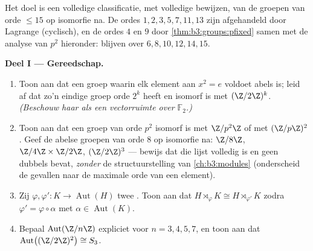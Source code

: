 \begin{problem}\label{pb:b3:groups:1}
Het doel is een volledige classificatie, met volledige bewijzen,
van de groepen van orde $\leq 15$ op isomorfie na. De ordes $1, 2,
3, 5, 7, 11, 13$ zijn afgehandeld door Lagrange (cyclisch), en de
ordes $4$ en $9$ door \cref{thm:b3:groups:pfixed} samen met de
analyse van $p^2$ hieronder: blijven over $6, 8, 10, 12, 14, 15$.

\medskip
\noindent\textbf{Deel I --- Gereedschap.}
\begin{enumerate}
  \item Toon aan dat een groep waarin elk element aan $x^2 = e$
        voldoet abels is; leid af dat zo'n eindige groep orde $2^k$
        heeft en isomorf is met $(\Z/2\Z)^k$. \emph{(Beschouw haar
        als een vectorruimte over $\mathbb F_2$.)}
  \item Toon aan dat een groep van orde $p^2$ isomorf is met
        $\Z/p^2\Z$ of met $(\Z/p\Z)^2$. Geef de abelse groepen van
        orde $8$ op isomorfie na: $\Z/8\Z$, $\Z/4\Z \times \Z/2\Z$,
        $(\Z/2\Z)^3$ --- bewijs dat die lijst volledig is en geen
        dubbels bevat, \emph{zonder} de structuurstelling van
        \cref{ch:b3:modules} (onderscheid de gevallen naar de
        maximale orde van een element).
  \item Zij $\varphi, \varphi' \colon K \to \operatorname{Aut}(H)$
        twee . Toon aan dat $H \rtimes_{\varphi} K \cong H
        \rtimes_{\varphi'} K$ zodra $\varphi' = \varphi \circ
        \alpha$ met $\alpha \in \operatorname{Aut}(K)$.
  \item Bepaal $\operatorname{Aut}(\Z/n\Z)$ expliciet voor $n = 3,
        4, 5, 7$, en toon aan dat
        $\operatorname{Aut}\bigl((\Z/2\Z)^2 \bigr) \cong S_3$.
\end{enumerate}


\end{problem}
